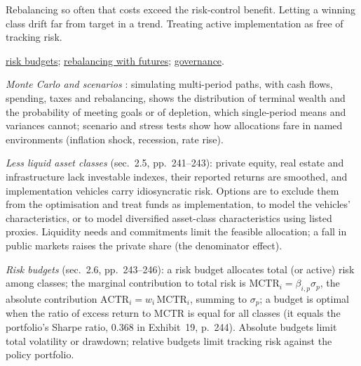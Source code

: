 \begin{qfmethod}
 Rebalancing so often that costs exceed the risk-control benefit. Letting a winning class drift far from target in a trend. Treating active implementation as free of tracking risk.

 \hyperref[meth:allocation-robustness-liquidity-risk-budget]{risk budgets}; \hyperref[meth:derivative-overlay-allocation]{rebalancing with futures}; \hyperref[def:investment-governance-allocation]{governance}.

\end{qfmethod}

\begin{qfmethod}\label{meth:allocation-robustness-liquidity-risk-budget}
 \emph{Monte Carlo and scenarios} \citep[chap.~6, secs.~2.2 and~3.3, pp.~225--228 and~264--266]{portfolio-management-in-practice-v1-2020}: simulating multi-period paths, with cash flows, spending, taxes and rebalancing, shows the distribution of terminal wealth and the probability of meeting goals or of depletion, which single-period means and variances cannot; scenario and stress tests show how allocations fare in named environments (inflation shock, recession, rate rise).

\emph{Less liquid asset classes} (sec.~2.5, pp.~241--243): private equity, real estate and infrastructure lack investable indexes, their reported returns are smoothed, and implementation vehicles carry idiosyncratic risk. Options are to exclude them from the optimisation and treat funds as implementation, to model the vehicles' characteristics, or to model diversified asset-class characteristics using listed proxies. Liquidity needs and commitments limit the feasible allocation; a fall in public markets raises the private share (the denominator effect).

\emph{Risk budgets} (sec.~2.6, pp.~243--246): a risk budget allocates total (or active) risk among classes; the marginal contribution to total risk is $\text{MCTR}_i=\beta_{i,p}\sigma_p$, the absolute contribution $\text{ACTR}_i=w_i\,\text{MCTR}_i$, summing to $\sigma_p$; a budget is optimal when the ratio of excess return to MCTR is equal for all classes (it equals the portfolio's Sharpe ratio, 0.368 in Exhibit~19, p.~244). Absolute budgets limit total volatility or drawdown; relative budgets limit tracking risk against the policy portfolio.


\end{qfmethod}
